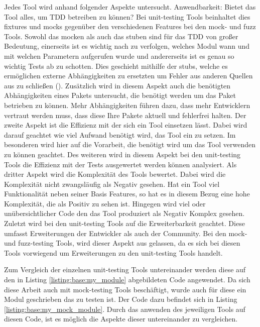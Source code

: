 Jedes Tool wird anhand folgender Aspekte untersucht. Anwendbarkeit: Bietet das
Tool alles, um TDD betreiben zu können? Bei unit-testing Tools beinhaltet dies
\Glspl{fixture} und \Glspl{mock} gegenüber den verschiedenen Features bei den
\gls{mock}- und \gls{fuzz} Tools. Sowohl das \gls{mock}en als auch das
\gls{stub}en sind für das TDD von großer Bedeutung, einerseits ist es wichtig
nach zu verfolgen, welches Modul wann und mit welchen Parametern aufgerufen
wurde und andererseits ist es genau so wichtig Tests ab zu schotten. Dies
geschieht mithilfe der \Glspl{stub}, welche es ermöglichen externe
Abhängigkeiten zu ersetzten um Fehler aus anderen Quellen aus zu schließen 
(\cite{percival:tdd:python}).
Zusätzlich wird in diesem Aspekt auch die benötigten Abhängigkeiten eines
Pakets untersucht, die benötigt werden um das Paket betrieben zu können. Mehr
Abhängigkeiten führen dazu, dass mehr Entwicklern vertraut werden muss, dass
diese Ihre Pakete aktuell und fehlerfrei halten.
Der zweite Aspekt ist die Effizienz mit der sich ein Tool einsetzen lässt. Dabei
wird darauf geachtet wie viel Aufwand benötigt wird, das Tool ein zu setzen. Im
besonderen wird hier auf die Vorarbeit, die benötigt wird um das Tool verwenden
zu können geachtet. Des weiteren wird in diesem Aspekt bei den unit-testing
Tools die Effizienz mit der Tests ausgewertet werden können analysiert.
Als dritter Aspekt wird die Komplexität des Tools bewertet. Dabei wird die
Komplexität nicht zwangsläufig als Negativ gesehen. Hat ein Tool viel
Funktionalität neben seiner Basis Features, so hat es in diesem Bezug eine hohe
Komplexität, die als Positiv zu sehen ist. Hingegen wird viel oder
unübersichtlicher Code den das Tool produziert als Negativ Komplex gesehen.
Zuletzt wird bei den unit-testing Tools auf die Erweiterbarkeit geachtet. Diese
umfasst Erweiterungen der Entwickler als auch der Community. Bei den mock- und
fuzz-testing Tools, wird dieser Aspekt aus gelassen, da es sich bei diesen Tools
vorwiegend um Erweiterungen zu den unit-testing Tools handelt.
\newline

Zum Vergleich der einzelnen unit-testing Tools untereinander werden diese auf
den in Listing \ref{listing:base:my_module} abgebildeten Code angewendet. Da
sich diese Arbeit auch mit \gls{mock}-testing Tools beschäftigt, wurde auch für
diese ein Modul geschrieben das zu testen ist.
Der Code dazu befindet sich in Listing \ref{listing:base:my_mock_module}. Durch
das anwenden des jeweiligen Tools auf diesen Code, ist es möglich die Aspekte
dieser untereinander zu vergleichen.

